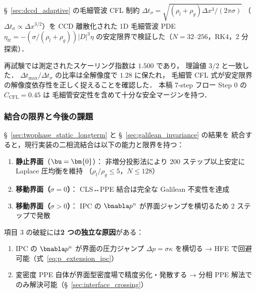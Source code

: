 §~\ref{sec:dccd_adaptive} の毛細管波 CFL 制約
$\Delta t_\sigma = \sqrt{(\rho_l + \rho_g)\Delta x^3 / (2\pi\sigma)}$
（$\Delta t_\sigma \propto \Delta x^{3/2}$）を
CCD 離散化された 1D 毛細管波 PDE
$\eta_{tt} = -(\sigma/(\rho_l{+}\rho_g))|D|^3\eta$
の安定限界で検証した（$N = 32$--$256$，RK4，2 分探索）．

再試験では測定されたスケーリング指数は $\mathbf{1.500}$ であり，
理論値 $3/2$ と一致した．
$\Delta t_{\max} / \Delta t_\sigma$ の比率は全解像度で $1.28$ に保たれ，
毛細管 CFL 式が安定限界の解像度依存性を正しく捉えることを確認した．
本稿 7-step フロー Step 0 の $C_{\mathrm{CFL}} = 0.45$ は
毛細管安定性を含めて十分な安全マージンを持つ．

\subsubsection{結合の限界と今後の課題}
\label{sec:coupling_limitations}

§~\ref{sec:twophase_static_longterm} と §~\ref{sec:galilean_invariance} の結果を
統合すると，現行実装の二相流結合は以下の能力と限界を持つ：

\begin{enumerate}[noitemsep]
  \item \textbf{静止界面}（$\bu = \bm{0}$）：
        非増分投影法により 200 ステップ以上安定に Laplace 圧均衡を維持
        （$\rho_l/\rho_g \leq 5$，$N \leq 128$）
  \item \textbf{移動界面（$\sigma = 0$）}：
        CLS↔PPE 結合は完全な Galilean 不変性を達成
  \item \textbf{移動界面（$\sigma > 0$）}：
        IPC の $\bnabla p^n$ が界面ジャンプを横切るため 2 ステップで発散
\end{enumerate}

\noindent
項目 3 の破綻には\textbf{2 つの独立な原因}がある：
\begin{enumerate}[noitemsep]
  \item IPC の $\bnabla p^n$ が界面の圧力ジャンプ $\Delta p = \sigma\kappa$ を横切る
        → HFE で回避可能（式~\eqref{eq:p_extension_ipc}）
  \item 変密度 PPE 自体が界面型密度場で精度劣化・発散する
        → 分相 PPE 解法でのみ解決可能（§~\ref{sec:interface_crossing}）
\end{enumerate}

